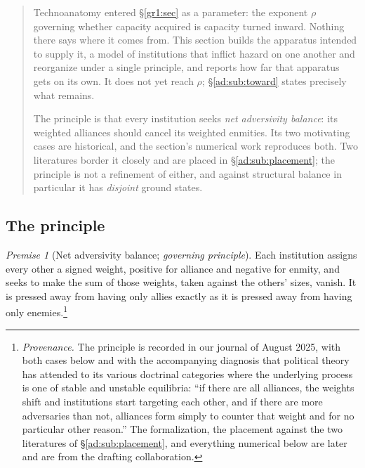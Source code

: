 \documentclass[11pt]{article}
\numberwithin{equation}{section}
\theoremstyle{plain}
\theoremstyle{definition}
\theoremstyle{remark}
\newtheorem{premise}{Premise}
\begin{document}
\begin{quote}\small
Technoanatomy entered \S\ref{gr1:sec} as a parameter: the exponent
$\rho$ governing whether capacity acquired is capacity turned inward.
Nothing there says where it comes from. This section builds the
apparatus intended to supply it, a model of institutions that
inflict hazard on one another and reorganize under a single principle, and reports how far that apparatus gets on its own. It does not yet
reach $\rho$; \S\ref{ad:sub:toward} states precisely what remains.

The principle is that every institution seeks \emph{net adversivity
balance}: its weighted alliances should cancel its weighted enmities.
Its two motivating cases are historical, and the section's numerical
work reproduces both. Two literatures border it closely and are placed
in \S\ref{ad:sub:placement}; the principle is not a refinement of
either, and against structural balance in particular it has
\emph{disjoint} ground states.
\end{quote}

\subsection{The principle}\label{ad:sub:principle}

\setcounter{premise}{6} %
\begin{premise}[Net adversivity balance; \emph{governing principle}]
\label{ad:phi:balance}
Each institution assigns every other a signed weight, positive for
alliance and negative for enmity, and seeks to make the sum of those
weights, taken against the others' sizes, vanish. It is pressed
away from having only allies exactly as it is pressed away from having
only enemies.\footnote{%
\emph{Provenance.} The principle is recorded in our journal of
August 2025, with both cases below and with the accompanying diagnosis
that political theory has attended to its various doctrinal categories
where the underlying process is one of stable and unstable equilibria:
``if there are all alliances, the weights shift and institutions start
targeting each other, and if there are more adversaries than not,
alliances form simply to counter that weight and for no particular other
reason.'' The formalization, the placement against the two literatures
of \S\ref{ad:sub:placement}, and everything numerical below are later
and are from the drafting collaboration.}
\end{premise}
\end{document}
